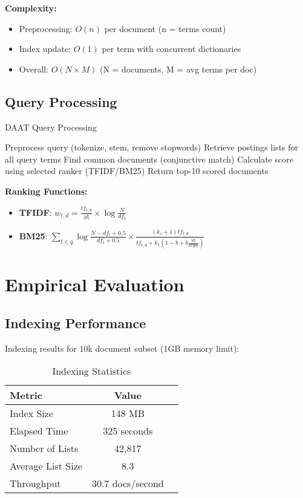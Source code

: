 \textbf{Complexity:}
\begin{itemize}
  \item Preprocessing: $O(n)$ per document (n = terms count)
  \item Index update: $O(1)$ per term with concurrent dictionaries
  \item Overall: $O(N \times M)$ (N = documents, M = avg terms per doc)
\end{itemize}

\subsection{Query Processing}
\begin{algorithm}[H]
  \caption{DAAT Query Processing}
  \begin{algorithmic}
    \STATE Preprocess query (tokenize, stem, remove stopwords)
    \STATE Retrieve postings lists for all query terms
    \STATE Find common documents (conjunctive match)
    \STATE Calculate score using selected ranker (TFIDF/BM25)
    \ENDFOR
    \STATE Return top-10 scored documents
  \end{algorithmic}
\end{algorithm}

\textbf{Ranking Functions:}
\begin{itemize}
  \item \textbf{TFIDF}: $w_{t,d} = \frac{tf_{t,d}}{|d|} \times \log\frac{N}{df_t}$
  \item \textbf{BM25}: $\sum_{t \in q} \log\frac{N-df_t+0.5}{df_t+0.5} \times \frac{(k_1+1)tf_{t,d}}{tf_{t,d} + k_1(1-b+b\frac{|d|}{avgdl})}$
\end{itemize}

\section{Empirical Evaluation}

\subsection{Indexing Performance}
Indexing results for 10k document subset (1GB memory limit):

\begin{table}[htbp]
  \caption{Indexing Statistics}
  \label{tab:index-stats}
  \begin{tabular}{lcc}
    \toprule
    \textbf{Metric}   & \textbf{Value}   \\
    \midrule
    Index Size        & 148 MB           \\
    Elapsed Time      & 325 seconds      \\
    Number of Lists   & 42,817           \\
    Average List Size & 8.3              \\
    Throughput        & 30.7 docs/second \\
    \bottomrule
  \end{tabular}
\end{table}

